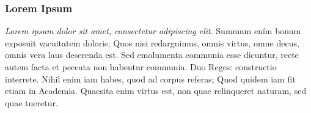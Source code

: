 \subsubsection{Lorem Ipsum}\label{lorem-ipsum} \par  \emph{Lorem ipsum dolor sit amet, consectetur adipiscing elit}. Summum ením bonum exposuit vacuitatem doloris; Quos nisi redarguimus, omnis virtus, omne decus, omnis vera laus deserenda est. Sed emolumenta communia esse dicuntur, recte autem facta et peccata non habentur communia. Duo Reges: constructio interrete. Nihil enim iam habes, quod ad corpus referas; Quod quidem iam fit etiam in Academia. Quaesita enim virtus est, non quae relinqueret naturam, sed quae tueretur. 